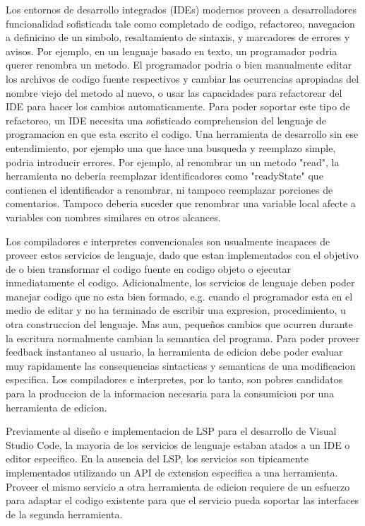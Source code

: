 \documentclass[12pt, a4paper]{report}
\begin{document}
    Los entornos de desarrollo integrados (IDEs) modernos proveen a desarrolladores funcionalidad sofisticada tale como completado de codigo, refactoreo, navegacion a definicino de un simbolo, resaltamiento de sintaxis, y marcadores de errores y avisos.
    Por ejemplo, en un lenguaje basado en texto, un programador podria querer renombra un metodo.
    El programador podria o bien manualmente editar los archivos de codigo fuente respectivos y cambiar las ocurrencias apropiadas del nombre viejo del metodo al nuevo, o usar las capacidades para refactorear del IDE para hacer los cambios automaticamente.
    Para poder soportar este tipo de refactoreo, un IDE necesita una sofisticado comprehension del lenguaje de programacion en que esta escrito el codigo.
    Una herramienta de desarrollo sin ese entendimiento, por ejemplo una que hace una busqueda y reemplazo simple, podria introducir errores.
    Por ejemplo, al renombrar un un metodo "read", la herramienta no deberia reemplazar identificadores como "readyState" que contienen el identificador a renombrar, ni tampoco reemplazar porciones de comentarios. Tampoco deberia suceder que renombrar una variable local afecte a variables con nombres similares en otros alcances.
    \cite{language_server_protocol_wiki}

    Los compiladores e interpretes convencionales son usualmente incapaces de proveer estos servicios de lenguaje, dado que estan implementados con el objetivo de o bien transformar el codigo fuente en codigo objeto o ejecutar inmediatamente el codigo.
    Adicionalmente, los servicios de lenguaje deben poder manejar codigo que no esta bien formado, e.g. cuando el programador esta en el medio de editar y no ha terminado de escribir una expresion, procedimiento, u otra construccion del lenguaje.
    Mas aun, pequeños cambios que ocurren durante la escritura normalmente cambian la semantica del programa.
    Para poder proveer feedback instantaneo al usuario, la herramienta de edicion debe poder evaluar muy rapidamente las consequencias sintacticas y semanticas de una modificacion especifica.
    Los compiladores e interpretes, por lo tanto, son pobres candidatos para la produccion de la informacion necesaria para la consumicion por una herramienta de edicion.
    \cite{language_server_protocol_wiki}

    Previamente al diseño e implementacion de LSP para el desarrollo de Visual Studio Code, la mayoria de los servicios de lenguaje estaban atados a un IDE o editor especifico.
    En la ausencia del LSP, los servicios son tipicamente implementados utilizando un API de extension especifica a una herramienta.
    Proveer el mismo servicio a otra herramienta de edicion requiere de un esfuerzo para adaptar el codigo existente para que el servicio pueda soportar las interfaces de la segunda herramienta.
    \cite{language_server_protocol_wiki}
\end{document}
